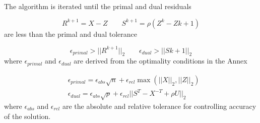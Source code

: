 The algorithm is iterated until the primal and dual residuals

\begin{equation*}
R^{k+1} = X-Z \qquad S^{k+1} = \rho(Z^k-Z{k+1})
\end{equation*}
are less than the primal and dual tolerance

\begin{equation*}
\epsilon_{primal}>||R^{k+1}||_2 \qquad\epsilon_{dual} > ||S{k+1}||_2
\end{equation*}
where $\epsilon_{primal}$ and $\epsilon_{dual}$ are derived from the optimality conditions in the Annex

\begin{align}
	&\epsilon_{primal} = \epsilon_{abs}\sqrt{n}+ \epsilon_{rel}\max(||X||_2,||Z||_2) \label{eq:ep_primal}\\
	&\epsilon_{dual} = \epsilon_{abs}\sqrt{p}+ \epsilon_{rel}||S^T-X^{-T}+\rho U||_2 \label{eq:ep_dual}
\end{align}
where $\epsilon_{abs}$ and $\epsilon_{rel}$ are the absolute and relative tolerance for controlling accuracy of the solution. 






